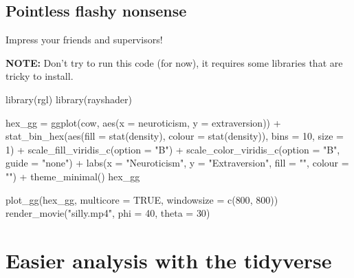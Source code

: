 \documentclass[
]{book}
\newenvironment{Shaded}{\begin{snugshade}}{\end{snugshade}}
\newcommand{\AttributeTok}[1]{\textcolor[rgb]{0.77,0.63,0.00}{#1}}
\newcommand{\ConstantTok}[1]{\textcolor[rgb]{0.00,0.00,0.00}{#1}}
\newcommand{\DecValTok}[1]{\textcolor[rgb]{0.00,0.00,0.81}{#1}}
\newcommand{\FunctionTok}[1]{\textcolor[rgb]{0.00,0.00,0.00}{#1}}
\newcommand{\NormalTok}[1]{#1}
\newcommand{\OtherTok}[1]{\textcolor[rgb]{0.56,0.35,0.01}{#1}}
\newcommand{\SpecialCharTok}[1]{\textcolor[rgb]{0.00,0.00,0.00}{#1}}
\newcommand{\StringTok}[1]{\textcolor[rgb]{0.31,0.60,0.02}{#1}}
\begin{document}
\hypertarget{pointless-flashy-nonsense}{%
\section{Pointless flashy nonsense}\label{pointless-flashy-nonsense}}

Impress your friends and supervisors!

\textbf{NOTE:} Don't try to run this code (for now), it requires some
libraries that are tricky to install.

\begin{Shaded}
\begin{Highlighting}[]
\FunctionTok{library}\NormalTok{(rgl)}
\FunctionTok{library}\NormalTok{(rayshader)}

\NormalTok{hex\_gg }\OtherTok{=} \FunctionTok{ggplot}\NormalTok{(cow, }\FunctionTok{aes}\NormalTok{(}\AttributeTok{x =}\NormalTok{  neuroticism, }\AttributeTok{y =}\NormalTok{ extraversion)) }\SpecialCharTok{+}
    \FunctionTok{stat\_bin\_hex}\NormalTok{(}\FunctionTok{aes}\NormalTok{(}\AttributeTok{fill =} \FunctionTok{stat}\NormalTok{(density), }\AttributeTok{colour =} \FunctionTok{stat}\NormalTok{(density)), }
                 \AttributeTok{bins =} \DecValTok{10}\NormalTok{,}
                 \AttributeTok{size =} \DecValTok{1}\NormalTok{) }\SpecialCharTok{+}
    \FunctionTok{scale\_fill\_viridis\_c}\NormalTok{(}\AttributeTok{option =} \StringTok{"B"}\NormalTok{) }\SpecialCharTok{+}
    \FunctionTok{scale\_color\_viridis\_c}\NormalTok{(}\AttributeTok{option =} \StringTok{"B"}\NormalTok{, }\AttributeTok{guide =} \StringTok{"none"}\NormalTok{) }\SpecialCharTok{+}
    \FunctionTok{labs}\NormalTok{(}\AttributeTok{x =} \StringTok{"Neuroticism"}\NormalTok{, }\AttributeTok{y =} \StringTok{"Extraversion"}\NormalTok{, }\AttributeTok{fill =} \StringTok{""}\NormalTok{,}
         \AttributeTok{colour =} \StringTok{""}\NormalTok{) }\SpecialCharTok{+}
    \FunctionTok{theme\_minimal}\NormalTok{()}
\NormalTok{hex\_gg}

\FunctionTok{plot\_gg}\NormalTok{(hex\_gg, }\AttributeTok{multicore =} \ConstantTok{TRUE}\NormalTok{, }\AttributeTok{windowsize =} \FunctionTok{c}\NormalTok{(}\DecValTok{800}\NormalTok{, }\DecValTok{800}\NormalTok{))}
\FunctionTok{render\_movie}\NormalTok{(}\StringTok{"silly.mp4"}\NormalTok{, }\AttributeTok{phi =} \DecValTok{40}\NormalTok{, }\AttributeTok{theta =} \DecValTok{30}\NormalTok{)}
\end{Highlighting}
\end{Shaded}

\hypertarget{tidyverse}{%
\chapter{Easier analysis with the tidyverse}\label{tidyverse}}
\end{document}
